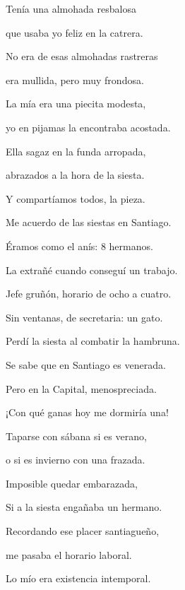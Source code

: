 \documentclass[11pt,twoside,openright,a5paper]{book}
\begin{document}
\begin{center}
Tenía una almohada resbalosa

que usaba yo feliz en la catrera.

No era de esas almohadas rastreras

era mullida, pero muy frondosa.

\vspace{0.5cm}

La mía era una piecita modesta,

yo en pijamas la encontraba acostada.

Ella sagaz en la funda arropada,

abrazados a la hora de  la siesta.

\vspace{0.5cm}

Y compartíamos todos, la pieza.

Me acuerdo de las siestas en Santiago.

Éramos como el anís: 8 hermanos.

\vspace{0.5cm}

La extrañé cuando conseguí un trabajo.

Jefe gruñón, horario de ocho a cuatro.

Sin ventanas, de secretaria: un gato.

\vspace{0.5cm}

Perdí la siesta al combatir la hambruna.

Se sabe que en Santiago es venerada.

Pero en la Capital, menospreciada.

¡Con qué ganas hoy me dormiría una!

\vspace{0.5cm}

Taparse con sábana si es verano,

o si es invierno con una frazada.

Imposible quedar embarazada,

Si a la siesta engañaba un hermano.

\vspace{0.5cm}

Recordando ese placer santiagueño,

me pasaba el horario laboral.

Lo mío era existencia intemporal.

\vspace{0.5cm}


\end{center}
\end{document}
